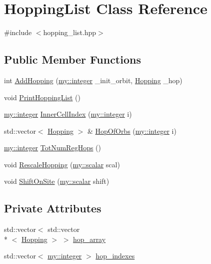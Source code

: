 \hypertarget{classHoppingList}{\section{Hopping\+List Class Reference}
\label{classHoppingList}
}


{\ttfamily \#include $<$hopping\+\_\+list.\+hpp$>$}

\subsection*{Public Member Functions}
\begin{DoxyCompactItemize}
\item 
int \hyperlink{classHoppingList_a870f59b8ce3b3c2b67bc861eb645017a}{Add\+Hopping} (\hyperlink{namespacemy_a42365393c537edae1e89d20ff90d1923}{my\+::integer} \+\_\+init\+\_\+orbit, \hyperlink{structHopping}{Hopping} \+\_\+hop)
\item 
void \hyperlink{classHoppingList_a1787b26ccd5f81870f4af5ab5c5fee88}{Print\+Hopping\+List} ()
\item 
\hyperlink{namespacemy_a42365393c537edae1e89d20ff90d1923}{my\+::integer} \hyperlink{classHoppingList_af85677a922e58fc00ff24aadbf62336e}{Inner\+Cell\+Index} (\hyperlink{namespacemy_a42365393c537edae1e89d20ff90d1923}{my\+::integer} i)
\item 
std\+::vector$<$ \hyperlink{structHopping}{Hopping} $>$ \& \hyperlink{classHoppingList_a53121eafd5e614499d1fbc0444aa6b72}{Hop\+Of\+Orbs} (\hyperlink{namespacemy_a42365393c537edae1e89d20ff90d1923}{my\+::integer} i)
\item 
\hyperlink{namespacemy_a42365393c537edae1e89d20ff90d1923}{my\+::integer} \hyperlink{classHoppingList_a0732215029c4b3b09c7a9ec719bfd370}{Tot\+Num\+Reg\+Hops} ()
\item 
void \hyperlink{classHoppingList_aa74121b6ad18cd85a8d0d6292a85c861}{Rescale\+Hopping} (\hyperlink{namespacemy_a12d9dde7e2fb58fbd11051705c382a86}{my\+::scalar} scal)
\item 
void \hyperlink{classHoppingList_a61a426ab894aa7d61e5200c421dc862d}{Shift\+On\+Site} (\hyperlink{namespacemy_a12d9dde7e2fb58fbd11051705c382a86}{my\+::scalar} shift)
\end{DoxyCompactItemize}
\subsection*{Private Attributes}
\begin{DoxyCompactItemize}
\item 
std\+::vector$<$ std\+::vector\\*
$<$ \hyperlink{structHopping}{Hopping} $>$ $>$ \hyperlink{classHoppingList_a8fba9bac26eb6fac90ac5801b6bce65f}{hop\+\_\+array}
\item 
std\+::vector$<$ \hyperlink{namespacemy_a42365393c537edae1e89d20ff90d1923}{my\+::integer} $>$ \hyperlink{classHoppingList_a842f0a1c53c7ac7b36293aa20e1ff699}{hop\+\_\+indexes}
\end{DoxyCompactItemize}


